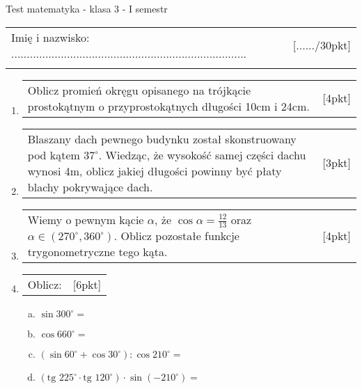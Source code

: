 \documentclass[12pt,a4paper]{article}
\begin{document}
	\begin{center}
		\LARGE Test matematyka - klasa 3 - I semestr
	\end{center}
	\vspace{1.5cm}
	\begin{tabular}{p{13cm} r}
		Imię i nazwisko: ............................................................................
		&[....../30pkt]\\ 
		\vspace{0.5cm}
	\end{tabular}
	\begin{enumerate}[1.]
		
		\item  \begin{tabular}{p{13cm} r}	%
	Oblicz promień okręgu opisanego na trójkącie prostokątnym o przyprostokątnych długości 10cm i 24cm.&[4pkt]\\ 
\end{tabular}
		
		\item  \begin{tabular}{p{13cm} r}
	Blaszany dach pewnego budynku został skonstruowany pod kątem $37^\circ$. Wiedząc, że wysokość samej części dachu wynosi 4m, oblicz jakiej długości powinny być płaty blachy pokrywające dach. 
	&[3pkt]\\ 
\end{tabular}

		\item \begin{tabular}{p{13cm} r}
	Wiemy o pewnym kącie $\alpha$, że $\cos \alpha = \frac{12}{13}$ oraz $\alpha\in (270^\circ,360^\circ)$. Oblicz pozostałe funkcje trygonometryczne tego kąta.
	&[4pkt]\\
\end{tabular}
		
		\item \begin{tabular}{p{13cm} r}
	Oblicz: &[6pkt]\\ 
\end{tabular}
\begin{enumerate}[a)]
	\item $\sin300^\circ=$
	\item $\cos 660^\circ= $
	\item $(\sin 60^\circ + \cos 30^\circ) : \cos210^\circ= $
	\item $(\text{tg }225^\circ \cdot \text{tg } 120^\circ) \cdot \sin (-210^\circ)=$
\end{enumerate}


\end{enumerate}
\end{document}
